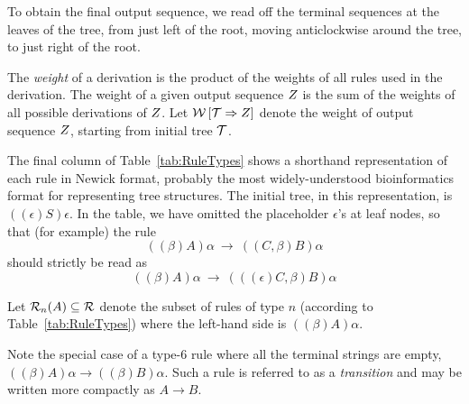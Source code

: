 \documentclass[10pt]{article}
\newcommand{\tabnum}[1]{\ref{tab:#1}}
\newcommand{\tabref}[1]{Table~\tabnum{#1}}
\begin{document}
To obtain the final output sequence, we read off the terminal sequences at the leaves of the tree,
from just left of the root, moving anticlockwise around the tree, to just right of the root.

\newcommand\seqweight[2]{\weight \left[ {#1} \Rightarrow {#2} \right]}

The {\em weight} of a derivation is the product of the weights of all rules used in the derivation.
The weight of a given output sequence $Z$ is the sum of the weights of all possible derivations of $Z$.
Let $\seqweight{\cal T}{\outseq}$ denote the weight of output sequence $Z$,
starting from initial tree ${\cal T}$.

The final column of \tabref{RuleTypes} shows a shorthand representation of each rule in Newick format,
probably the most widely-understood bioinformatics format for representing tree structures.
The initial tree, in this representation, is $((\epsilon)S)\epsilon$.
In the table, we have omitted the placeholder $\epsilon$'s at leaf nodes,
so that (for example) the rule
\[
((\beta)A)\alpha\ \to\ ((C,\beta)B)\alpha
\]
should strictly be read as
\[
((\beta)A)\alpha\ \to\ (((\epsilon)C,\beta)B)\alpha
\]

Let ${\cal R}_{n}(A) \subseteq {\cal R}$ denote the subset of rules of type $n$ (according to \tabref{RuleTypes})
where the left-hand side is $((\beta)A)\alpha$.

Note the special case of a type-6 rule where all the terminal strings are empty,
$((\beta)A)\alpha \to ((\beta)B)\alpha$.
Such a rule is referred to as a {\em transition} and may be written more compactly as $A \to B$.
\end{document}
